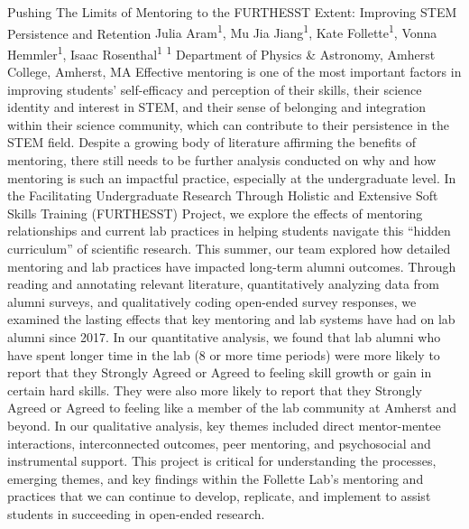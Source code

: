 \makeabstract
    {
    Pushing The Limits of Mentoring to the FURTHESST Extent: Improving STEM Persistence and Retention
    }
    {
    Julia Aram\textsuperscript{1}, Mu Jia Jiang\textsuperscript{1}, Kate Follette\textsuperscript{1}, Vonna Hemmler\textsuperscript{1}, Isaac Rosenthal\textsuperscript{1}
    }
    {
    \textsuperscript{1} Department of Physics \& Astronomy, Amherst College, Amherst, MA 
    }
    {
    Effective mentoring is one of the most important factors in improving students{\textquoteright} self-efficacy and perception of their skills, their science identity and interest in STEM, and their sense of belonging and integration within their science community, which can contribute to their persistence in the STEM field. Despite a growing body of literature affirming the benefits of mentoring, there still needs to be further analysis conducted on why and how mentoring is such an impactful practice, especially at the undergraduate level. In the Facilitating Undergraduate Research Through Holistic and Extensive Soft Skills Training (FURTHESST) Project, we explore the effects of mentoring relationships and current lab practices in helping students navigate this {\textquotedblleft}hidden curriculum{\textquotedblright} of scientific research.
    }
    {
    This summer, our team explored how detailed mentoring and lab practices have impacted long-term alumni outcomes. Through reading and annotating relevant literature, quantitatively analyzing data from alumni surveys, and qualitatively coding open-ended survey responses, we examined the lasting effects that key mentoring and lab systems have had on lab alumni since 2017. 
    }
    {
    In our quantitative analysis, we found that lab alumni who have spent longer time in the lab (8 or more time periods) were more likely to report that they Strongly Agreed or Agreed to feeling skill growth or gain in certain hard skills. They were also more likely to report that they Strongly Agreed or Agreed to feeling like a member of the lab community at Amherst and beyond. In our qualitative analysis, key themes included direct mentor-mentee interactions, interconnected outcomes, peer mentoring, and psychosocial and instrumental support.
    }
    {
    This project is critical for understanding the processes, emerging themes, and key findings within the Follette Lab{\textquoteright}s mentoring and practices that we can continue to develop, replicate, and implement to assist students in succeeding in open-ended research. 
    }

    \newpage
    
